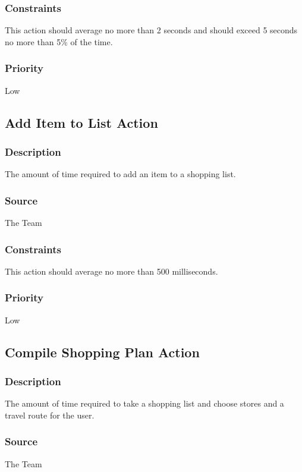 \subsubsection{Constraints}
This action should average no more than 2 seconds and should exceed 5 seconds no more than 5\% of the time.
\subsubsection{Priority}
Low

\subsection{Add Item to List Action}
\subsubsection{Description}
The amount of time required to add an item to a shopping list.
\subsubsection{Source}
The Team
\subsubsection{Constraints}
This action should average no more than 500 milliseconds.
\subsubsection{Priority}
Low

\subsection{Compile Shopping Plan Action}
\subsubsection{Description}
The amount of time required to take a shopping list and choose stores and a travel route for the user.
\subsubsection{Source}
The Team
